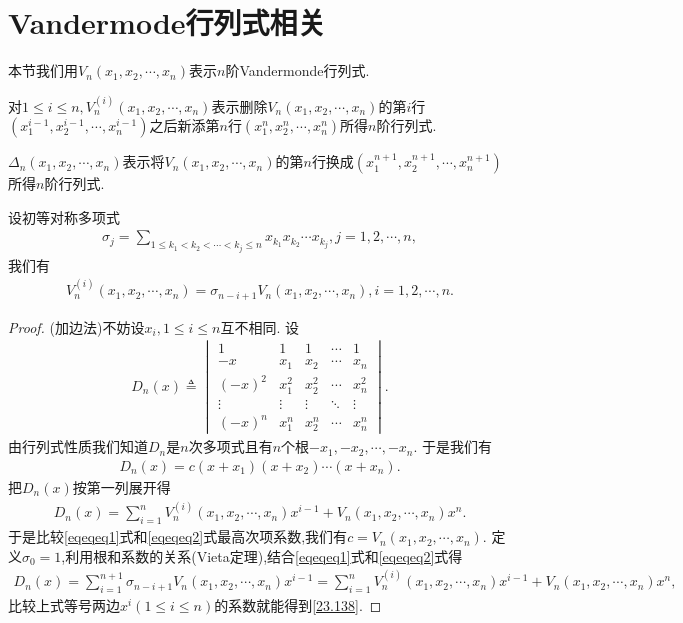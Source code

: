\documentclass[../../main.tex]{subfiles}
\begin{document}
\section{Vandermode行列式相关}

本节我们用\(V_n(x_1,x_2,\cdots,x_n)\)表示\(n\)阶Vandermonde行列式.
\begin{definition}
对\(1\leqslant i\leqslant n,V_n^{(i)}(x_1,x_2,\cdots,x_n)\)表示删除\(V_n(x_1,x_2,\cdots,x_n)\)的第\(i\)行\((x_1^{i - 1},x_2^{i - 1},\cdots,x_n^{i - 1})\)之后新添第\(n\)行\((x_1^{n},x_2^{n},\cdots,x_n^{n})\)所得\(n\)阶行列式.
\end{definition}

\begin{definition}
\(\Delta_n(x_1,x_2,\cdots,x_n)\)表示将\(V_n(x_1,x_2,\cdots,x_n)\)的第\(n\)行换成\((x_1^{n + 1},x_2^{n + 1},\cdots,x_n^{n + 1})\)所得\(n\)阶行列式.
\end{definition}


\begin{example}
设初等对称多项式
\begin{align}\label{23.137}
\sigma_j=\sum_{1\leqslant k_1<k_2<\cdots<k_j\leqslant n}x_{k_1}x_{k_2}\cdots x_{k_j},j = 1,2,\cdots,n,
\end{align}
我们有
\begin{align}
V_n^{(i)}(x_1,x_2,\cdots,x_n)=\sigma_{n - i + 1}V_n(x_1,x_2,\cdots,x_n),i = 1,2,\cdots,n.\label{23.138}
\end{align}
\end{example}
\begin{proof}
(加边法)不妨设\(x_i,1\leqslant i\leqslant n\)互不相同. 设
\begin{align*}
D_n(x)\triangleq\begin{vmatrix}
1&1&1&\cdots&1\\
-x&x_1&x_2&\cdots&x_n\\
(-x)^2&x_1^2&x_2^2&\cdots&x_n^2\\
\vdots&\vdots&\vdots&\ddots&\vdots\\
(-x)^n&x_1^n&x_2^n&\cdots&x_n^n
\end{vmatrix}.
\end{align*}
由行列式性质我们知道\(D_n\)是\(n\)次多项式且有\(n\)个根\(-x_1,-x_2,\cdots,-x_n\). 于是我们有
\begin{align}\label{eqeqeq1}
D_n(x)=c(x + x_1)(x + x_2)\cdots(x + x_n).
\end{align}
把\(D_n(x)\)按第一列展开得
\begin{align}\label{eqeqeq2}
D_n(x)=\sum_{i = 1}^{n}V_n^{(i)}(x_1,x_2,\cdots,x_n)x^{i - 1}+V_n(x_1,x_2,\cdots,x_n)x^n.
\end{align}
于是比较\eqref{eqeqeq1}式和\eqref{eqeqeq2}式最高次项系数,我们有\(c = V_n(x_1,x_2,\cdots,x_n)\). 定义\(\sigma_0 = 1\),利用根和系数的关系(Vieta定理),结合\eqref{eqeqeq1}式和\eqref{eqeqeq2}式得
\begin{align*}
D_n(x)=\sum_{i = 1}^{n + 1}\sigma_{n - i + 1}V_n(x_1,x_2,\cdots,x_n)x^{i - 1}=\sum_{i = 1}^{n}V_n^{(i)}(x_1,x_2,\cdots,x_n)x^{i - 1}+V_n(x_1,x_2,\cdots,x_n)x^n,
\end{align*}
比较上式等号两边$x^i(1\leq i\leq n)$的系数就能得到\eqref{23.138}. 
\end{proof}
\end{document}
